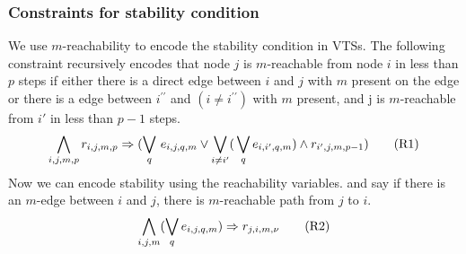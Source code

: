 \subsubsection{Constraints for stability condition}
%
We use $m$-reachability to encode the stability condition in VTSs.
%
The following constraint recursively encodes that node $j$ is $m$-reachable from node $i$ in less than $p$ steps
if either there is a direct edge between $i$ and $j$ with $m$ present on the edge or there is a edge between $i^{\prime \prime}$ and
$(i \neq i^{\prime \prime})$ with $m$ present, and j is $m$-reachable from $i'$ in less than $p-1$ steps.
%
\begin{align}
  \bigwedge\limits_{i,j,m,p} r_{i,j,m,p} \Rightarrow (\bigvee_{q} \, e_{i,j,q,m} \lor \bigvee_{i\neq i^{\prime}} ( \, \bigvee_{q} e_{i,i^{\prime},q,m}) \land r_{i^{\prime},j,m,p-1} )
  \tag{R1}\label{eq:reach1}
\end{align}
Now we can encode stability using the reachability variables.
and say if there is an $m$-edge between $i$ and $j$, there is
$m$-reachable path from $j$ to $i$.
\begin{align}
 \bigwedge\limits_{i,j,m} (\bigvee_{q} e_{i,j,q,m}) \Rightarrow r_{j,i,m,\nu}
  \tag{R2}\label{eq:reach2}
\end{align}







